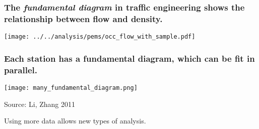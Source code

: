 \documentclass{beamer}
\begin{document}
\begin{frame}

    \frametitle{The \emph{fundamental diagram} in traffic engineering shows
        the relationship between flow and density.}


    \centerline{\texttt{[image: ../../analysis/pems/occ\_flow\_with\_sample.pdf]}}

\end{frame}
\begin{frame}

    \frametitle{Each station has a fundamental diagram, which can be fit in
    parallel.}


\centerline{\texttt{[image: many\_fundamental\_diagram.png]}}

Source: Li, Zhang 2011

Using more data allows new types of analysis.

%
%
%

\end{frame}
\end{document}
